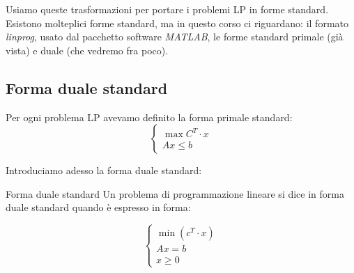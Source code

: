 \documentclass[a4paper,11pt]{article}
\begin{document}
Usiamo queste trasformazioni per portare i problemi LP in forme standard.
Esistono molteplici forme standard, ma in questo corso ci riguardano: il formato \textit{linprog}, usato dal pacchetto software \textit{MATLAB}, le forme standard primale (già vista) e duale (che vedremo fra poco). 

\subsection{Forma duale standard}
Per ogni problema LP avevamo definito la forma primale standard:
\[
	\begin{cases}
		\max{C^T \cdot x} \\
		Ax \leq b
	\end{cases}
\]

Introduciamo adesso la forma duale standard:
\begin{definition}{Forma duale standard}
	Un problema di programmazione lineare si dice in forma duale standard quando è espresso in forma:
	
	\[
		\begin{cases}
			\min(c^T \cdot x) \\
			Ax = b \\
			x \geq 0
		\end{cases}
	\]

\end{definition}
\end{document}
